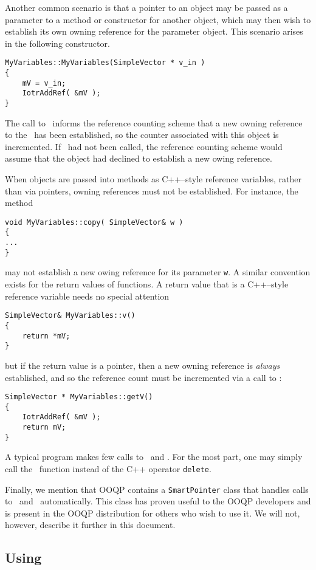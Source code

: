 Another common scenario is that a pointer to an object may be passed
as a parameter to a method or constructor for another object, which
may then wish to establish its own owning reference for the parameter
object. This scenario arises in the following constructor.
\begin{verbatim}
MyVariables::MyVariables(SimpleVector * v_in )
{
    mV = v_in;
    IotrAddRef( &mV );
}
\end{verbatim}
The call to \IotrAddRef\ informs the reference counting scheme that a
new owning reference to the \SimpleVector\ has been established, so
the counter associated with this object is incremented. If
\IotrAddRef\ had not been called, the reference counting scheme would
assume that the object had declined to establish a new owing
reference.

When objects are passed into methods as C++--style reference
variables, rather than via pointers, owning references must not be
established. For instance, the method
\begin{verbatim}
void MyVariables::copy( SimpleVector& w )
{
...
}
\end{verbatim}
may not establish a new owing reference for its parameter
\texttt{w}. A similar convention exists for the return values of
functions. A return value that is a C++--style reference variable
needs no special attention
\begin{verbatim}
SimpleVector& MyVariables::v()
{
    return *mV;
}
\end{verbatim}
but if the return value is a pointer, then a new owning reference is
{\em always} established, and so the reference count must be
incremented via a call to \IotrAddRef:
\begin{verbatim}
SimpleVector * MyVariables::getV()
{
    IotrAddRef( &mV );
    return mV;
}
\end{verbatim}

A typical program makes few calls to \IotrAddRef\ and \IotrRelease.
For the most part, one may simply call the \IotrRelease\ function
instead of the C++ operator \verb-delete-.

Finally, we mention that OOQP contains a {\tt SmartPointer} class that
handles calls to \IotrAddRef\ and \IotrRelease\ automatically. This
class has proven useful to the OOQP developers and is present in the
OOQP distribution for others who wish to use it. We will not,
however, describe it further in this document.

\subsection{Using \SimpleVector} \label{sec.using-simplevector}

